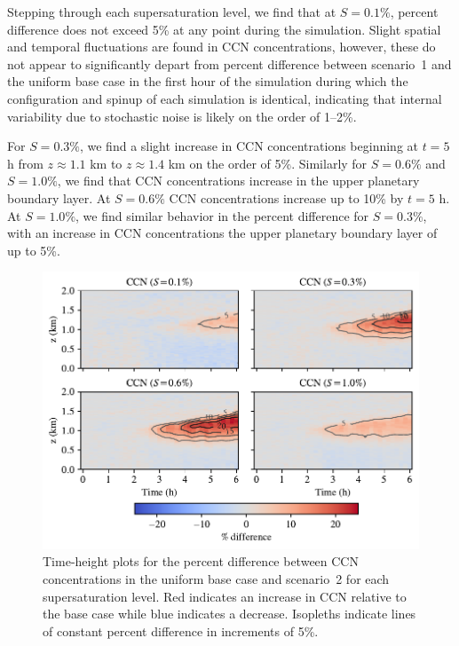 Stepping through each supersaturation level, we find that at $S=0.1\%$, percent difference does not exceed 5\% at any point during the simulation. Slight spatial and temporal fluctuations are found in CCN concentrations, however, these do not appear to significantly depart from percent difference between scenario~1 and the uniform base case in the first hour of the simulation during which the configuration and spinup of each simulation is identical, indicating that internal variability due to stochastic noise is likely on the order of 1--2\%.

For $S=0.3\%$, we find a slight increase in CCN concentrations beginning at $t=5$ h from $z\approx1.1$ km to $z\approx1.4$ km on the order of 5\%. Similarly for $S=0.6\%$ and $S=1.0\%$, we find that CCN concentrations increase in the upper planetary boundary layer. At $S=0.6\%$ CCN concentrations increase up to 10\% by $t=5$ h. At $S=1.0\%$, we find similar behavior in the percent difference for $S=0.3\%$, with an increase in CCN concentrations the upper planetary boundary layer of up to 5\%.

\begin{figure}[!t]
  \centering
    \includegraphics[width=\textwidth]{figures/chapter5/height-time-ccn-pdiff-road-10x.pdf}
    \caption{Time-height plots for the percent difference between CCN concentrations in the uniform base case and scenario~2 for each supersaturation level. Red indicates an increase in CCN relative to the base case while blue indicates a decrease. Isopleths indicate lines of constant percent difference in increments of 5\%.}
    \label{fig:ht-ccn-pdiff-s2}
\end{figure}


